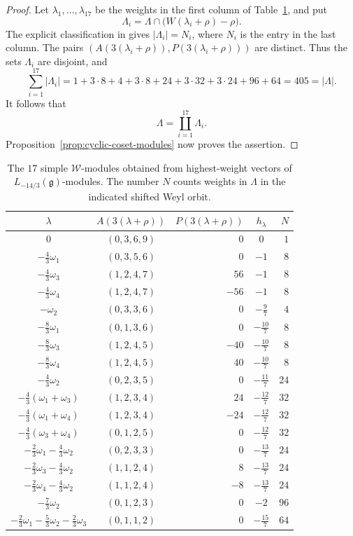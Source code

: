 \documentclass[11pt]{amsart}
\numberwithin{equation}{section}
\theoremstyle{definition}
\theoremstyle{remark}
\newcommand{\g}{\mathfrak g}
\begin{document}
\begin{proof}
Let $\lambda_1,\ldots,\lambda_{17}$ be the weights in the first
column of Table~\ref{tab:seventeen-simple-modules}, and put
\[
 \Lambda_i=\Lambda\cap\bigl(W(\lambda_i+\rho)-\rho\bigr).
\]
The explicit classification in \cite[Proposition~3.4 and Theorem~3.6]{AV}
gives $|\Lambda_i|=N_i$, where $N_i$ is the entry in the last column.
The pairs $(A(3(\lambda_i+\rho)),P(3(\lambda_i+\rho)))$ are distinct.
Thus the sets $\Lambda_i$ are disjoint, and
\[
 \sum_{i=1}^{17}|\Lambda_i|
 =1+3\cdot8+4+3\cdot8+24+3\cdot32+3\cdot24+96+64
 =405=|\Lambda|.
\]
It follows that
\[
 \Lambda=\coprod_{i=1}^{17}\Lambda_i.
\]
Proposition~\ref{prop:cyclic-coset-modules} now proves the assertion.
\end{proof}

\begin{table}[htbp]
\centering
\small
\renewcommand{\arraystretch}{1.15}
\begin{tabular}{c|c|r|c|r}
$\lambda$ & $A(3(\lambda+\rho))$ & $P(3(\lambda+\rho))$
 & $h_\lambda$ & $N$\\ \hline
$0$ & $(0,3,6,9)$ & $0$ & $0$ & $1$\\
$-\frac43\omega_1$ & $(0,3,5,6)$ & $0$ & $-1$ & $8$\\
$-\frac43\omega_3$ & $(1,2,4,7)$ & $56$ & $-1$ & $8$\\
$-\frac43\omega_4$ & $(1,2,4,7)$ & $-56$ & $-1$ & $8$\\
$-\omega_2$ & $(0,3,3,6)$ & $0$ & $-\frac97$ & $4$\\
$-\frac83\omega_1$ & $(0,1,3,6)$ & $0$ & $-\frac{10}7$ & $8$\\
$-\frac83\omega_3$ & $(1,2,4,5)$ & $-40$ & $-\frac{10}7$ & $8$\\
$-\frac83\omega_4$ & $(1,2,4,5)$ & $40$ & $-\frac{10}7$ & $8$\\
$-\frac43\omega_2$ & $(0,2,3,5)$ & $0$ & $-\frac{11}7$ & $24$\\
$-\frac43(\omega_1+\omega_3)$ & $(1,2,3,4)$ & $24$ & $-\frac{12}7$ & $32$\\
$-\frac43(\omega_1+\omega_4)$ & $(1,2,3,4)$ & $-24$ & $-\frac{12}7$ & $32$\\
$-\frac43(\omega_3+\omega_4)$ & $(0,1,2,5)$ & $0$ & $-\frac{12}7$ & $32$\\
$-\frac23\omega_1-\frac43\omega_2$ & $(0,2,3,3)$ & $0$ & $-\frac{13}7$ & $24$\\
$-\frac23\omega_3-\frac43\omega_2$ & $(1,1,2,4)$ & $8$ & $-\frac{13}7$ & $24$\\
$-\frac23\omega_4-\frac43\omega_2$ & $(1,1,2,4)$ & $-8$ & $-\frac{13}7$ & $24$\\
$-\frac73\omega_2$ & $(0,1,2,3)$ & $0$ & $-2$ & $96$\\
$-\frac23\omega_1-\frac53\omega_2-\frac23\omega_3$
 & $(0,1,1,2)$ & $0$ & $-\frac{15}7$ & $64$
\end{tabular}
\caption{The $17$ simple $\mathcal W$-modules obtained from highest-weight
vectors of $L_{-14/3}(\g)$-modules. The number $N$ counts weights in $\Lambda$ in
the indicated shifted Weyl orbit.}
\label{tab:seventeen-simple-modules}
\end{table}
\end{document}
